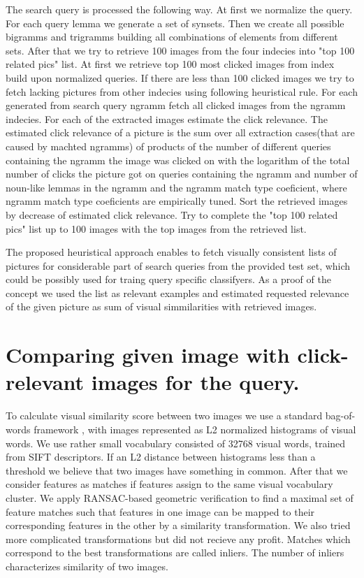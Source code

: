\documentclass[11pt]{article} %
\begin{document}
The search query is processed the following way. At first we normalize the query. For each query lemma we generate a set of synsets\cite{NLTKSite}. Then we create all possible bigramms and trigramms building all combinations of elements from different sets. After that we try to retrieve 100 images from the four indecies into "top 100 related pics" list. At first we retrieve top 100 most clicked images from index build upon normalized queries. If there are less than 100 clicked images we try to fetch lacking pictures from other indecies using following heuristical rule. For each generated from search query ngramm fetch all clicked images from the ngramm indecies. For each  of the extracted images estimate the click relevance. The estimated click relevance of a picture is the sum over all extraction cases(that are caused by machted ngramms) of products of the number of different queries containing the ngramm the image was clicked on with the logarithm of the total number of clicks the picture got on queries containing the ngramm and number of noun-like lemmas in the ngramm and the ngramm match type coeficient, where ngramm match type coeficients are empirically tuned. Sort the retrieved images by decrease of estimated click relevance. Try  to complete the "top 100 related pics" list up to 100 images with the top images from the retrieved list.

The proposed heuristical approach enables to fetch visually consistent lists of  pictures for considerable part of search queries from the provided test set, which could be possibly used for traing query specific classifyers.  As a proof of the concept we used the list as relevant examples and estimated requested relevance of the given picture as sum of visual simmilarities with retrieved images.

\section{Comparing given image with click-relevant images for the query.}
To calculate visual similarity score between two images we use a standard bag-of-words
framework \cite{Sivic03}, with images represented as L2 normalized histograms of
visual words. We use rather small vocabulary consisted of 32768 visual
words, trained from SIFT descriptors. If an L2 distance between
histograms less than a threshold we believe that two images have
something in common. After that we consider features as matches if
features assign to the same visual vocabulary cluster. We apply
RANSAC-based geometric verification to find a maximal set of feature
matches such that features in one image can be mapped to their
corresponding features in the other by a similarity transformation.
We also tried more complicated transformations but did not recieve any
profit. Matches which correspond to the best transformations are
called inliers. The number of inliers characterizes similarity of two images.
\end{document}
